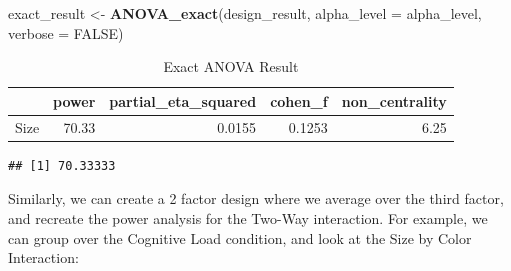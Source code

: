 \documentclass[]{book}
\newenvironment{Shaded}{\begin{snugshade}}{\end{snugshade}}
\newcommand{\CommentTok}[1]{\textcolor[rgb]{0.56,0.35,0.01}{\textit{#1}}}
\newcommand{\DataTypeTok}[1]{\textcolor[rgb]{0.13,0.29,0.53}{#1}}
\newcommand{\KeywordTok}[1]{\textcolor[rgb]{0.13,0.29,0.53}{\textbf{#1}}}
\newcommand{\NormalTok}[1]{#1}
\newcommand{\OperatorTok}[1]{\textcolor[rgb]{0.81,0.36,0.00}{\textbf{#1}}}
\newcommand{\OtherTok}[1]{\textcolor[rgb]{0.56,0.35,0.01}{#1}}
\newcommand{\StringTok}[1]{\textcolor[rgb]{0.31,0.60,0.02}{#1}}
\begin{document}
\begin{Shaded}
\begin{Highlighting}[]
\NormalTok{exact_result <-}\StringTok{ }\KeywordTok{ANOVA_exact}\NormalTok{(design_result,}
                            \DataTypeTok{alpha_level =}\NormalTok{ alpha_level,}
                            \DataTypeTok{verbose =} \OtherTok{FALSE}\NormalTok{)}
\end{Highlighting}
\end{Shaded}

\begin{table}[t]

\caption{\label{tab:unnamed-chunk-137}Exact ANOVA Result}
\centering
\begin{tabular}{l|r|r|r|r}
\hline
  & power & partial\_eta\_squared & cohen\_f & non\_centrality\\
\hline
Size & 70.33 & 0.0155 & 0.1253 & 6.25\\
\hline
\end{tabular}
\end{table}

\begin{Shaded}
\end{Shaded}

\begin{verbatim}
## [1] 70.33333
\end{verbatim}

Similarly, we can create a 2 factor design where we average over the third factor, and recreate the power analysis for the Two-Way interaction. For example, we can group over the Cognitive Load condition, and look at the Size by Color Interaction:
\end{document}
